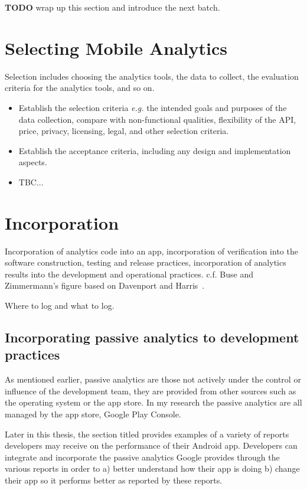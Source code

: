 \textbf{TODO} wrap up this section and introduce the next batch.


\section{Selecting Mobile Analytics}
Selection includes choosing the analytics tools, the data to collect, the evaluation criteria for the analytics tools, and so on.
\begin{itemize}
    \item Establish the selection criteria \emph{e.g.} the intended goals and purposes of the data collection, compare with non-functional qualities, flexibility of the API, price, privacy, licensing, legal, and other selection criteria.
    \item Establish the acceptance criteria, including any design and implementation aspects.
    \item TBC...
\end{itemize}




\section{Incorporation}
Incorporation of analytics code into an app, incorporation of verification into the software construction, testing and release practices, incorporation of analytics results into the development and operational practices. c.f. Buse and Zimmermann's figure based on Davenport and Harris~\cite{davenport}. 

Where to log and what to log.



\subsection{Incorporating passive analytics to development practices}
As mentioned earlier, passive analytics are those not actively under the control or influence of the development team, they are provided from other sources such as the operating system or the app store. In my research the passive analytics are all managed by the app store, Google Play Console.

Later in this thesis, the section titled \href{google_play_console_section}{\emph{}} provides examples of a variety of reports developers may receive on the performance of their Android app. Developers can integrate and incorporate the passive analytics Google provides through the various reports in order to a) better understand how their app is doing b) change their app so it performs better as reported by these reports.


